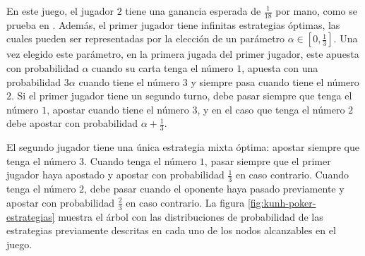 En este juego, el jugador $2$ tiene una ganancia esperada de $\frac{1}{18}$ por mano, como se prueba en \cite{bib:kuhn-poker}. Además, el primer jugador tiene infinitas estrategias óptimas, las cuales pueden ser representadas por la elección de un parámetro $\alpha \in [ 0, \frac{1}{3} ]$. Una vez elegido este parámetro, en la primera jugada del primer jugador, este apuesta con probabilidad $\alpha$ cuando su carta tenga el número $1$, apuesta con una probabilidad $3 \alpha$ cuando tiene el número $3$ y siempre pasa cuando tiene el número $2$. Si el primer jugador tiene un segundo turno, debe pasar siempre que tenga el número $1$, apostar cuando tiene el número $3$, y en el caso que tenga el número $2$ debe apostar con probabilidad $\alpha + \frac{1}{3}$.

El segundo jugador tiene una única estrategia mixta óptima: apostar siempre que tenga el número $3$. Cuando tenga el número $1$, pasar siempre que el primer jugador haya apostado y apostar con probabilidad $\frac{1}{3}$ en caso contrario. Cuando tenga el número $2$, debe pasar cuando el oponente haya pasado previamente y apostar con probabilidad $\frac{2}{3}$ en caso contrario. La figura \ref{fig:kunh-poker-estrategias} muestra el árbol con las distribuciones de probabilidad de las estrategias previamente descritas en cada uno de los nodos alcanzables en el juego.

